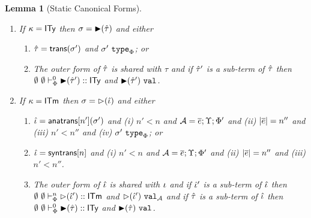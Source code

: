 \documentclass[12pt]{article}
\newtheorem{lemma}{Lemma}
\begin{document}
\begin{lemma}[Static Canonical Forms]
\begin{enumerate}
\begin{enumerate}[(I)]
    \end{enumerate}
\item If $\kappa = {\sf ITy}$ then $\sigma={\blacktriangleright}(\hat{\tau})$ and either 
    \begin{enumerate}
    \item[(I)] $\hat{\tau} = {\sf trans}(\sigma')$ and $\sigma'~\mathtt{type}_{\Phi}$; or
    \item[(II)] The outer form of $\hat{\tau}$ is shared with $\tau$ and if $\hat{\tau}'$ is a sub-term of $\hat{\tau}$ then $\emptyset~\emptyset \vdash_{\Phi}^{0} {\blacktriangleright}(\hat{\tau}') :: {\sf ITy}$ and ${\blacktriangleright}(\hat{\tau}')~\mathtt{val}$.
    \end{enumerate}
\item If $\kappa = {\sf ITm}$ then $\sigma={\rhd}(\hat{\iota})$ and either 
    \begin{enumerate}
    \item[(I)] $\hat{\iota}={\sf anatrans}[n'](\sigma')$ and (i) $n' < n$ and $\mathcal{A}=\overline{e};\Upsilon;\Phi'$ and (ii) $|\overline{e}| = n''$ and (iii) $n' < n''$ and (iv) $\sigma'~\mathtt{type}_{\Phi}$; or
    \item[(II)] $\hat{\iota}={\sf syntrans}[n]$ and (i) $n' < n$ and $\mathcal{A}=\overline{e};\Upsilon;\Phi'$ and (ii) $|\overline{e}| = n''$ and (iii) $n' < n''$.
    \item[(III)] The outer form of $\hat{\iota}$ is shared with $\iota$ and if $\hat{\iota}'$ is a sub-term of $\hat{\iota}$ then $\emptyset~\emptyset \vdash_{\Phi}^{n} {\rhd}(\hat{\iota}') :: {\sf ITm}$ and ${\rhd}(\hat{\iota}')~\mathtt{val}_{\mathcal{A}}$ and if $\hat{\tau}$ is a sub-term of $\hat{\iota}$ then $\emptyset~\emptyset \vdash_{\Phi}^{0} {\blacktriangleright}(\hat{\tau}) :: {\sf ITy}$ and ${\blacktriangleright}(\hat{\tau})~\mathtt{val}$.
    \end{enumerate}
\end{enumerate}
\end{lemma}
\end{document}

